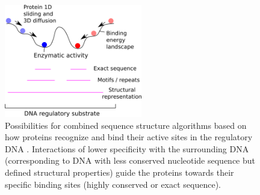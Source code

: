 \documentclass[sigconf]{acmart}
\begin{document}
\begin{figure}[ht]
  \centering
  \includegraphics[width=6cm,keepaspectratio]{smir_fig_algorithms.png}
  \caption{Possibilities for combined sequence structure algorithms based on how proteins recognize and bind their active sites in the regulatory DNA \cite{Marcovitz2013-kg,Levo2015-iu,Slattery2014-ne,Rohs2009-hm}. Interactions of lower specificity with the surrounding DNA (corresponding to DNA with less conserved nucleotide sequence but defined structural properties) guide the proteins towards their specific binding sites (highly conserved or exact sequence).}
\end{figure}



\end{document}

